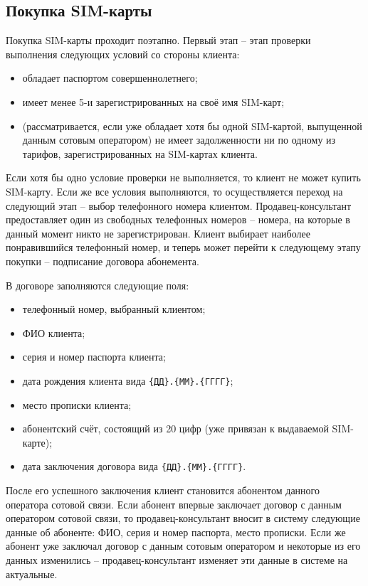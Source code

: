 \subsection{Покупка SIM-карты}


Покупка SIM-карты проходит поэтапно. Первый этап -- этап проверки выполнения следующих условий со стороны клиента:
\begin{itemize}
    \item обладает паспортом совершеннолетнего;
    \item имеет менее 5-и зарегистрированных на своё имя SIM-карт;
    \item (рассматривается, если уже обладает хотя бы одной SIM-картой, выпущенной данным сотовым оператором) не имеет задолженности ни по одному из тарифов, зарегистрированных на SIM-картах клиента.
\end{itemize}

Если хотя бы одно условие проверки не выполняется, то клиент не может купить SIM-карту. Если же все условия выполняются, то осуществляется переход на следующий этап -- выбор телефонного номера клиентом. Продавец-консультант предоставляет один из свободных телефонных номеров -- номера, на которые в данный момент никто не зарегистрирован. Клиент выбирает наиболее понравившийся телефонный номер, и теперь может перейти к следующему этапу покупки -- подписание договора абонемента.

В договоре заполняются следующие поля:
\begin{itemize}
    \item телефонный номер, выбранный клиентом;
    \item ФИО клиента;
    \item серия и номер паспорта клиента;
    \item дата рождения клиента вида \texttt{\{ДД\}.\{ММ\}.\{ГГГГ\}};
    \item место прописки клиента;
    \item абонентский счёт, состоящий из 20 цифр (уже привязан к выдаваемой SIM-карте);
    \item дата заключения договора вида \texttt{\{ДД\}.\{ММ\}.\{ГГГГ\}}.
\end{itemize}

После его успешного заключения клиент становится абонентом данного оператора сотовой связи. Если абонент впервые заключает договор с данным оператором сотовой связи, то продавец-консультант вносит в систему следующие данные об абоненте: ФИО, серия и номер паспорта, место прописки. Если же абонент уже заключал договор с данным сотовым оператором и некоторые из его данных изменились -- продавец-консультант изменяет эти данные в системе на актуальные.

